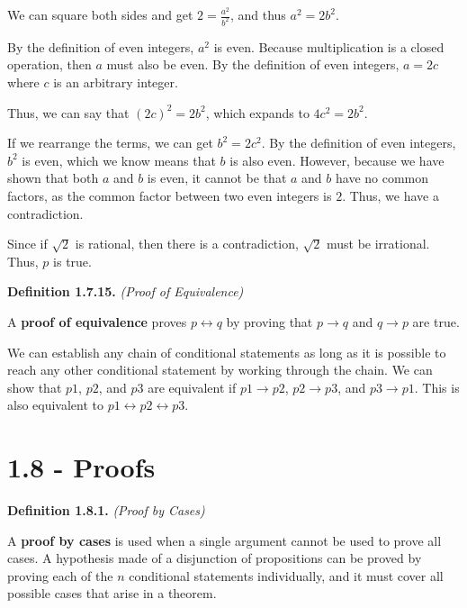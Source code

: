 \documentclass[12pt, letterpaper]{article}
\begin{document}
We can square both sides and get $ 2 = \frac{a^2}{b^2} $, and thus $ a^2 = 2b^2 $.
\medskip

By the definition of even integers, $ a ^ 2 $ is even. Because multiplication is a closed operation, then $ a $ must also be even. By the definition of even integers, $ a = 2c $ where $ c $ is an arbitrary integer.
\medskip

Thus, we can say that $ (2c)^2 = 2b^2 $, which expands to $ 4c^2 = 2b^2 $.
\medskip

If we rearrange the terms, we can get $ b^2 = 2c^2 $. By the definition of even integers, $ b^2 $ is even, which we know means that $ b $ is also even. However, because we have shown that both $ a $ and $ b $ is even, it cannot be that $ a $ and $ b $  have no common factors, as the common factor between two even integers is $ 2 $. Thus, we have a contradiction.
\medskip

Since if $ \sqrt{2} $ is rational, then there is a contradiction, $ \sqrt{2} $ must be irrational. Thus, $ p $ is true.

\bigskip
\bigskip

\textbf{Definition 1.7.15.} \textit{(Proof of Equivalence)}
\medskip

A \textbf{proof of equivalence} proves $ p \leftrightarrow q $ by proving that $ p \rightarrow q $ and $ q \rightarrow p $ are true.
\medskip

We can establish any chain of conditional statements as long as it is possible to reach any other conditional statement by working through the chain. We can show that $ p1 $, $ p2 $, and $ p3 $ are equivalent if $ p1 \rightarrow p2 $, $ p2 \rightarrow p3 $, and $ p3 \rightarrow p1 $. This is also equivalent to $ p1 \leftrightarrow p2 \leftrightarrow p3 $.

\pagebreak

\section*{1.8 - Proofs}

\textbf{Definition 1.8.1.} \textit{(Proof by Cases)}
\medskip

A \textbf{proof by cases} is used when a single argument cannot be used to prove all cases. A hypothesis made of a disjunction of propositions can be proved by proving each of the $ n $ conditional statements individually, and it must cover all possible cases that arise in a theorem.

\bigskip
\bigskip
\end{document}
